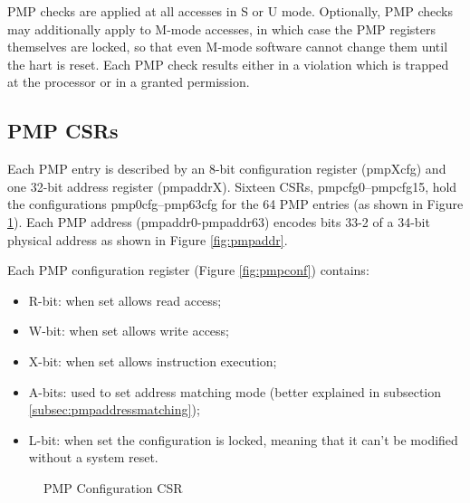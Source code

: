 PMP checks are applied at all accesses in S or U mode. Optionally, PMP checks may
additionally apply to M-mode accesses, in which case the PMP registers
themselves are locked, so that even M-mode software cannot change them until the
hart is reset. Each PMP check results either in a violation which is trapped at
the processor or in a granted permission.

\subsection{PMP CSRs}

Each PMP entry is described by an 8-bit configuration register (pmpXcfg) and one
32-bit address register (pmpaddrX). Sixteen CSRs, pmpcfg0–pmpcfg15, hold the
configurations pmp0cfg–pmp63cfg for the 64 PMP entries (as shown in Figure \ref{fig:pmpcfgs}).
Each PMP address (pmpaddr0-pmpaddr63) encodes bits 33-2 of a 34-bit physical address
as shown in Figure \ref{fig:pmpaddr}.

Each PMP configuration register (Figure \ref{fig:pmpconf}) contains:
\begin{itemize}
  \item R-bit: when set allows read access;

  \item W-bit: when set allows write access;

  \item X-bit: when set allows instruction execution;

  \item A-bits: used to set address matching mode (better explained in subsection
    \ref{subsec:pmpaddressmatching});

  \item L-bit: when set the configuration is locked, meaning that it can't be modified
    without a system reset.
\end{itemize}

\begin{figure}[htbp]
  \centering
  \def\stackalignment{r} %
  {\scriptsize }
  \caption{PMP Configuration CSR}
  \label{fig:pmpcfgs}
\end{figure}

